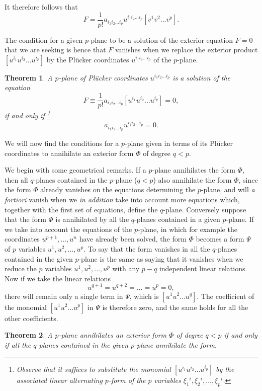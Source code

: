 \documentclass[leqno,11pt]{book}
\numberwithin{equation}{chapter}
\theoremstyle{shape1}
\newtheorem*{thm*}{\hspace{15pt}Theorem}
\theoremstyle{shape0}
\theoremstyle{shape2}
\theoremstyle{definition}
\begin{document}
It therefore follows that
\[
F=\frac{1}{p!}a_{i_{1}i_{2}\dots i_{p}}u^{i_{1}i_{2}\dots i_{p}}[v^{1}v^{2}\dots v^{p}].
\]

The condition for a given $p$-plane to be a solution of the exterior equation $F=0$ that we are seeking is hence that $F$ vanishes when we replace the exterior product $[u^{i_{1}}u^{i_{2}}\dots u^{i_{p}}]$ by the Pl\"ucker coordinates $u^{i_{1}i_{2}\dots i_{p}}$ of the $p$-plane.
\begin{thm*}
  A $p$-plane of Pl\"ucker coordinates $u^{i_{1}i_{2}\dots i_{p}}$ is a solution of the equation
\[
F\equiv\frac{1}{p!}a_{i_{1}i_{2}\dots i_{p}}[u^{i_{1}}u^{i_{2}}\dots u^{i_{p}}]=0,
\]
if and only if \footnote{Observe that it suffices to substitute the monomial $[u^{i_{1}}u^{i_{2}}\dots u^{i_{p}}]$ by the associated linear alternating $p$-form of the $p$ variables  $\xi_{1}{}^{i},\xi_{2}{}^{i},\dots,\xi_{p}{}^{i}$.}
\[
a_{i_{1}i_{2}\dots i_{p}}u^{i_{1}i_{2}\dots i_{p}}=0.
\]
\end{thm*}

\vspace{12pt}\fsec We will now find the conditions for a $p$-plane given in terms of its Pl\"ucker coordinates to annihilate an exterior form $\Phi$ of degree $q<p$.

We begin with some geometrical remarks. If a $p$-plane annihilates the form $\Phi$, then all $q$-planes contained in the $p$-plane ($q<p$) also annihilate the form $\Phi$, since the form $\Phi$ already vanishes on the equations determining the $p$-plane, and will \emph{a fortiori} vanish when we \emph{in addition} take into account more equations which, together with the first set of equations, define the $q$-plane. Conversely suppose that the form $\Phi$ is annihilated by all the $q$-planes contained in a given $p$-plane. If we take into account the equations of the $p$-plane, in which for example the coordinates $u^{p+1},\dots,u^{n}$ have already been solved, the form $\Phi$ becomes a form $\Psi$ of $p$ variables $u^{1},u^{2},\dots,u^{p}$. To say that the form vanishes in all the $q$-planes contained in the given $p$-plane is the same as saying that it vanishes when we reduce the $p$ variables $u^{1},u^{2},\dots,u^{p}$ with any $p-q$ independent linear relations. Now if we take the linear relations
\[
u^{q+1}=u^{q+2}=\dots=u^{p}=0,
\]
there will remain only a single term in $\Psi$, which is $[u^{1}u^{2}\dots u^{q}]$. The coefficient of the monomial $[u^{1}u^{2}\dots u^{p}]$ in $\Psi$ is therefore zero, and the same holds for all the other coefficients.
\begin{thm*}
  A $p$-plane  annihilates an exterior form $\Phi$ of degree $q<p$ if and only if all the $q$-planes contained in the given $p$-plane annihilate the form.
\end{thm*}
\end{document}
